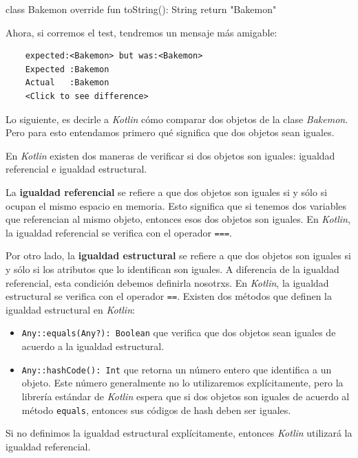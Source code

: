   \begin{kotlin}
    class Bakemon {
      override fun toString(): String {
        return "Bakemon"
      }
    }
  \end{kotlin}

  Ahora, si corremos el test, tendremos un mensaje más amigable:

  \begin{verbatim}
    expected:<Bakemon> but was:<Bakemon>
    Expected :Bakemon
    Actual   :Bakemon
    <Click to see difference>
  \end{verbatim}

  Lo siguiente, es decirle a \textit{Kotlin} cómo comparar dos objetos de la clase \textit{Bakemon}.
  Pero para esto entendamos primero qué significa que dos objetos sean iguales.

  En \textit{Kotlin} existen dos maneras de verificar si dos objetos son iguales: igualdad 
  referencial e igualdad estructural.
  
  La \textbf{igualdad referencial} se refiere a que dos objetos son 
  iguales si y sólo si ocupan el mismo espacio en memoria.
  Esto significa que si tenemos dos variables que referencian al mismo objeto, entonces esos dos 
  objetos son iguales.
  En \textit{Kotlin}, la igualdad referencial se verifica con el operador \texttt{===}.

  Por otro lado, la \textbf{igualdad estructural} se refiere a que dos objetos son iguales si y sólo
  si los atributos que lo identifican son iguales.
  A diferencia de la igualdad referencial, esta condición debemos definirla nosotrxs.
  En \textit{Kotlin}, la igualdad estructural se verifica con el operador \texttt{==}.
  Existen dos métodos que definen la igualdad estructural en \textit{Kotlin}:

  \begin{itemize}
    \item \texttt{Any::equals(Any?): Boolean} que verifica que dos objetos sean iguales de acuerdo 
      a la igualdad estructural.
    \item \texttt{Any::hashCode(): Int} que retorna un número entero que identifica a un objeto.
      Este número generalmente no lo utilizaremos explícitamente, pero la librería estándar de 
      \textit{Kotlin} espera que si dos objetos son iguales de acuerdo al método \texttt{equals},
      entonces sus códigos de hash deben ser iguales.
  \end{itemize}

  \begin{important}
    Si no definimos la igualdad estructural explícitamente, entonces \textit{Kotlin} utilizará la
    igualdad referencial.
  \end{important}

